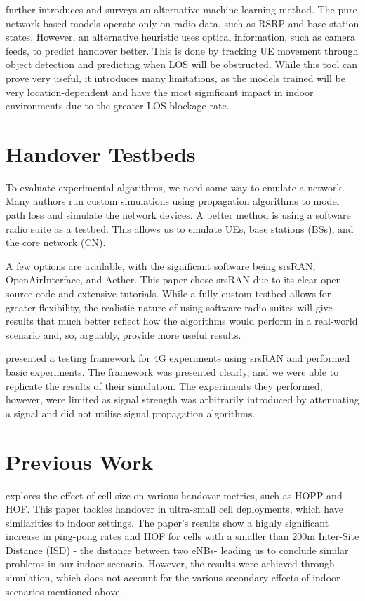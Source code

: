 \citet{mollel_survey_2021} further introduces and surveys an alternative machine learning method. The pure network-based models operate only on radio data, such as RSRP and base station states. However, an alternative heuristic uses optical information, such as camera feeds, to predict handover better. This is done by tracking UE movement through object detection and predicting when LOS will be obstructed. While this tool can prove very useful, it introduces many limitations, as the models trained will be very location-dependent and have the most significant impact in indoor environments due to the greater LOS blockage rate.

\section{Handover Testbeds}
To evaluate experimental algorithms, we need some way to emulate a network. Many authors run custom simulations using propagation algorithms to model path loss and simulate the network devices. A better method is using a software radio suite as a testbed. This allows us to emulate UEs, base stations (BSs), and the core network (CN).

A few options are available, with the significant software being srsRAN, OpenAirInterface, and Aether. This paper chose srsRAN due to its clear open-source code and extensive tutorials. While a fully custom testbed allows for greater flexibility, the realistic nature of using software radio suites will give results that much better reflect how the algorithms would perform in a real-world scenario and, so, arguably, provide more useful results.

\citet{powell_handover_2021} presented a testing framework for 4G experiments using srsRAN and performed basic experiments. The framework was presented clearly, and we were able to replicate the results of their simulation. The experiments they performed, however, were limited as signal strength was arbitrarily introduced by attenuating a signal and did not utilise signal propagation algorithms.

\section{Previous Work}

\citet{sucasas_simulation_2019} explores the effect of cell size on various handover metrics, such as HOPP and HOF. This paper tackles handover in ultra-small cell deployments, which have similarities to indoor settings. The paper's results show a highly significant increase in ping-pong rates and HOF for cells with a smaller than 200m Inter-Site Distance (ISD) - the distance between two eNBs- leading us to conclude similar problems in our indoor scenario. However, the results were achieved through simulation, which does not account for the various secondary effects of indoor scenarios mentioned above.

